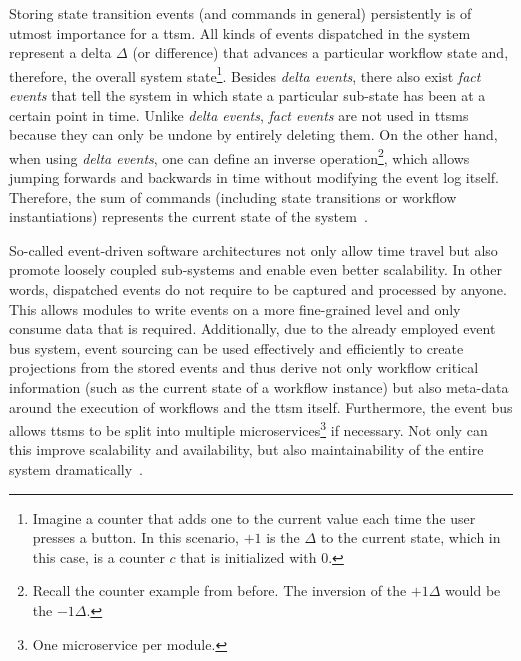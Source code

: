 Storing state transition events (and commands in general) persistently is of utmost importance for a \gls{ttsm}. All kinds of events dispatched in the system represent a delta $\Delta$ (or difference) that advances a particular workflow state and, therefore, the overall system state\footnote{Imagine a counter that adds one to the current value each time the user presses a button. In this scenario, $+1$ is the $\Delta$ to the current state, which in this case, is a counter $c$ that is initialized with $0$.}. Besides \textit{delta events}, there also exist \textit{fact events} that tell the system in which state a particular sub-state has been at a certain point in time. Unlike \textit{delta events}, \textit{fact events} are not used in \glspl{ttsm} because they can only be undone by entirely deleting them. On the other hand, when using \textit{delta events}, one can define an inverse operation\footnote{Recall the counter example from before. The inversion of the $+1 \Delta$ would be the $-1 \Delta$.}, which allows jumping forwards and backwards in time without modifying the event log itself. Therefore, the sum of commands (including state transitions or workflow instantiations) represents the current state of the system~\cite{fact_vs_delta_event_types,event_sourcing_and_cqrs}.

So-called event-driven software architectures not only allow time travel but also promote loosely coupled sub-systems and enable even better scalability. In other words, dispatched events do not require to be captured and processed by anyone. This allows modules to write events on a more fine-grained level and only consume data that is required. Additionally, due to the already employed event bus system, event sourcing can be used effectively and efficiently to create projections from the stored events and thus derive not only workflow critical information (such as the current state of a workflow instance) but also meta-data around the execution of workflows and the \gls{ttsm} itself. Furthermore, the event bus allows \glspl{ttsm} to be split into multiple microservices\footnote{One microservice per module.} if necessary. Not only can this improve scalability and availability, but also maintainability of the entire system dramatically~\cite{event_sourcing_and_cqrs}.

